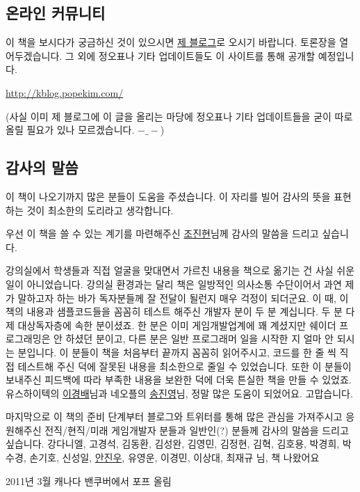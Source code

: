 \subsection{온라인 커뮤니티}
이 책을 보시다가 궁금하신 것이 있으시면 \href{https://kblog.popekim.com/}{제 블로그}로 오시기 바랍니다. 토론장을 열어두겠습니다. 그 외에 정오표나 기타 업데이트들도 이 사이트를 통해 공개할 예정입니다.

\url{http://kblog.popekim.com/}

(사실 이미 제 블로그에 이 글을 올리는 마당에 정오표나 기타 업데이트들을 굳이 따로 올릴 필요가 있나 모르겠습니다. $-\_ -$)

\subsection{감사의 말씀}

이 책이 나오기까지 많은 분들이 도움을 주셨습니다. 이 자리를 빌어 감사의 뜻을 표현하는 것이 최소한의 도리라고 생각합니다.

우선 이 책을 쓸 수 있는 계기를 마련해주신 \href{https://twitter.com/HoiPoiPaul}{조진현}님께 감사의 말씀을 드리고 싶습니다.

강의실에서 학생들과 직접 얼굴을 맞대면서 가르친 내용을 책으로 옮기는 건 사실 쉬운 일이 아니었습니다. 강의실 환경과는 달리 책은 일방적인 의사소통 수단이어서 과연 제가 말하고자 하는 바가 독자분들께 잘 전달이 될런지 매우 걱정이 되더군요. 이 때, 이 책의 내용과 샘플코드들을 꼼꼼히 테스트 해주신 개발자 분이 두 분 계십니다. 두 분 다 제 대상독자층에 속한 분이셨죠. 한 분은 이미 게임개발업계에 꽤 계셨지만 쉐이더 프로그래밍은 안 하셨던 분이고, 다른 분은 일반 프로그래머 일을 시작한 지 얼마 안 되시는 분입니다. 이 분들이 책을 처음부터 끝까지 꼼꼼히 읽어주시고, 코드를 한 줄 씩 직접 테스트해 주신 덕에 잘못된 내용을 최소한으로 줄일 수 있었습니다. 또한 이 분들이 보내주신 피드백에 따라 부족한 내용을 보완한 덕에 더욱 튼실한 책을 만들 수 있었죠. 유스하이텍의 \href{https://twitter.com/zinzza}{이경배}님과 네오플의 \href{https://twitter.com/denoil}{송진영}님, 정말 많은 도움이 되었어요. 고맙습니다.

마지막으로 이 책의 준비 단계부터 블로그와 트위터를 통해 많은 관심을 가져주시고 응원해주신 전직/현직/미래 게임개발자 분들과 일반인(?) 분들께 감사의 말씀을 드리고 싶습니다. 강다니엘, 고경석, 김동환, 김성완, 김영민, 김정현, 김혁, 김호용, 박경희, 박수경, 손기호, 신성일, \href{https://twitter.com/banhae}{안진우}, 유영운, 이경민, 이상대, 최재규 님, 책 나왔어요~~~



2011년 3월 캐나다 밴쿠버에서
포프 올림